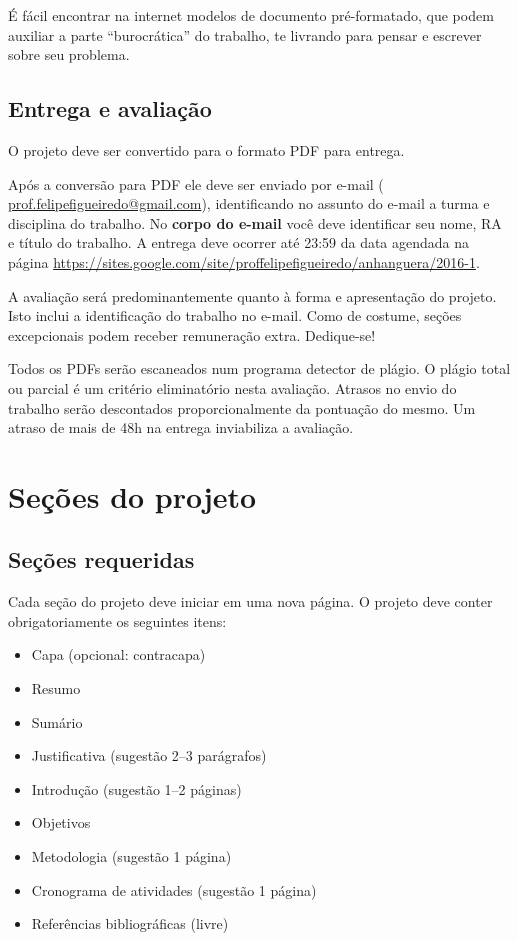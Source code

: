 \documentclass[a4paper]{article}
\begin{document}
É fácil encontrar na internet modelos de documento pré-formatado, que podem auxiliar a parte ``burocrática'' do trabalho, te livrando para pensar e escrever sobre seu problema.

\subsection{Entrega e avaliação}

O projeto deve ser convertido para o formato PDF para entrega.

Após a conversão para PDF ele deve ser enviado por e-mail ( \url{prof.felipefigueiredo@gmail.com}), identificando no assunto do e-mail a turma e disciplina do trabalho.
No {\bf corpo do e-mail} você deve identificar seu nome, RA e título do trabalho.
A entrega deve ocorrer até 23:59 da data agendada na página \url{https://sites.google.com/site/proffelipefigueiredo/anhanguera/2016-1}.

A avaliação será predominantemente quanto à forma e apresentação do projeto.
Isto inclui a identificação do trabalho no e-mail.
Como de costume, seções excepcionais podem receber remuneração extra.
Dedique-se!

Todos os PDFs serão escaneados num programa detector de plágio.
O plágio total ou parcial é um critério eliminatório nesta avaliação.
Atrasos no envio do trabalho serão descontados proporcionalmente da pontuação do mesmo.
Um atraso de mais de 48h na entrega inviabiliza a avaliação.

\section{Seções do projeto}

\subsection{Seções requeridas}

Cada seção do projeto deve iniciar em uma nova página.
O projeto deve conter obrigatoriamente os seguintes itens:

\begin{itemize}
\item Capa (opcional: contracapa)
\item Resumo
\item Sumário
\item Justificativa (sugestão 2--3 parágrafos)
\item Introdução (sugestão 1--2 páginas)
\item Objetivos
\item Metodologia (sugestão 1 página)
\item Cronograma de atividades (sugestão 1 página)
\item Referências bibliográficas (livre)
\end{itemize}
\end{document}
